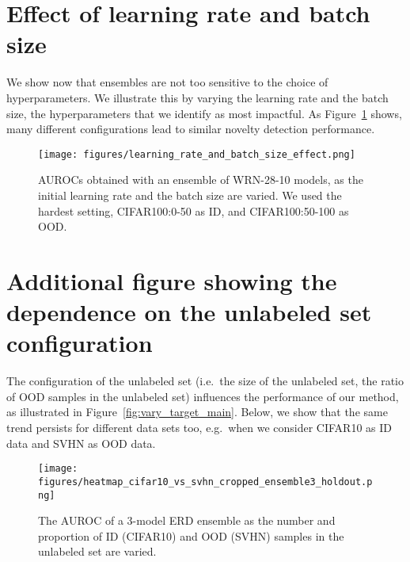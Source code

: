 \vspace{-1cm}
\section{Effect of learning rate and batch size}
\label{sec:appendix_lr_bs}

We show now that  ensembles are not too sensitive to the choice of
hyperparameters. We illustrate this by varying the learning rate and the batch
size, the hyperparameters that we identify as most impactful. As
Figure~\ref{fig:lr_and_bs_hyperparam} shows, many different configurations lead
to similar novelty detection performance.

\vspace{0.5cm}
\begin{figure}[H]
    \centering
    \texttt{[image: figures/learning\_rate\_and\_batch\_size\_effect.png]}

    \caption{
        AUROCs obtained with an ensemble of WRN-28-10 models, as the initial
        learning rate and the batch size are varied.
        We used the hardest setting, CIFAR100:0-50 as ID, and
        CIFAR100:50-100 as OOD.
    }
    \label{fig:lr_and_bs_hyperparam}
\end{figure}






\vspace{-0.2cm}
\section{Additional figure showing the dependence on the unlabeled set configuration}
\label{sec:appendix_vary_ood_ratio}

The configuration of the unlabeled set (i.e.\ the size of the unlabeled set, the
ratio of OOD samples in the unlabeled set) influences the performance of our
method, as illustrated in Figure~\ref{fig:vary_target_main}. Below, we show that
the same trend persists for different data sets too, e.g.\ when we consider
CIFAR10 as ID data and SVHN as OOD data.

\vspace{0.5cm}
\begin{figure}[h]
  \centering
  \texttt{[image: figures/heatmap\_cifar10\_vs\_svhn\_cropped\_ensemble3\_holdout.png]}

  \label{fig:vary_target}

  \caption{ The AUROC of a 3-model ERD ensemble as the number and proportion of
  ID (CIFAR10) and OOD (SVHN) samples in the unlabeled set are varied.  }


\end{figure}




